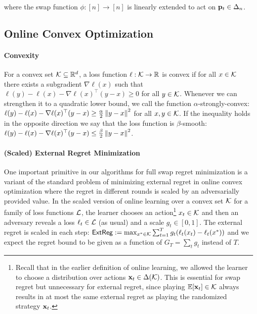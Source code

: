 \documentclass[final,12pt]{alt2025}
\begin{document}
\noindent
where the swap function $\phi:[n]\rightarrow[n]$ is linearly extended to act on $\mathbf{p}_t \in \Delta_{n}$.

\subsection{Online Convex Optimization}

\paragraph{Convexity} For a convex set $\mathcal{K} \subseteq \mathbb{R}^d$, a loss function  $\ell: \mathcal{K} \to \mathbb{R}$ is convex if for all $x \in \mathcal{K}$ there exists a subgradient $\nabla \ell(x)$ such that $\ell(y)-\ell(x)-\nabla \ell(x)^\top(y-x) \geq 0$ for all $y \in \mathcal{K}$. Whenever we can strengthen it to a quadratic lower bound, we call the function $\alpha$-strongly-convex: $\ell(y)-\ell(x)-\nabla \ell(x)^\top(y-x) \geq \frac{\alpha}{2}\left\|y-x\right\|^2$  for all $x,y \in \mathcal{K}$. If the inequality holds in the opposite direction we say that the loss function is $\beta$-smooth:  $\ell(y)-\ell(x)-\nabla \ell(x)^\top(y-x) \leq \frac{\beta}{2}\left\|y-x\right\|^2$.

\paragraph{(Scaled) External Regret Minimization} One important primitive in our algorithms for full swap regret minimization is a variant of the standard problem of minimizing external regret in online convex optimization where the regret in different rounds is scaled by an adversarially provided value. In the scaled version of online learning over a convex set $\mathcal{K}$ for a family of loss functions $\mathcal{L}$, the learner chooses an action\footnote{Recall that in the earlier definition of online learning, we allowed the learner to choose a distribution over actions $\mathbf{x}_t \in \Delta(\mathcal{K})$. This is essential for swap regret but unnecessary for external regret, since playing $\mathbb{E}[\mathbf{x}_t] \in \mathcal{K}$ always results in at most the same external regret as playing the randomized strategy $\mathbf{x}_t$.} $x_t \in \mathcal{K}$ and then an adversary reveals a loss $\ell_t \in \mathcal{L}$ (as usual) and a scale $g_t \in [0,1]$. The external regret is scaled in each step: 
$\operatorname{\mathsf{ExtReg}} := \max_{x^* \in\mathcal{K}} \sum_{t=1}^T g_t(\ell_t(x_t) - \ell_t(x^*))$ and we expect the regret bound to be given as a function of $G_T = \sum_t g_t$ instead of $T$.
\end{document}
